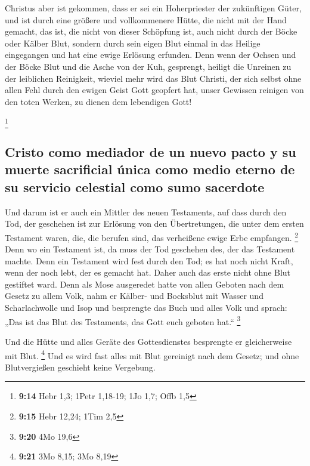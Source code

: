  Christus aber ist gekommen, dass er sei ein
Hoherpriester der zukünftigen Güter, und ist durch eine größere und
vollkommenere Hütte, die nicht mit der Hand gemacht, das ist, die nicht
von dieser Schöpfung ist,  auch nicht durch der Böcke
oder Kälber Blut, sondern durch sein eigen Blut einmal in das Heilige
eingegangen und hat eine ewige Erlösung erfunden.  Denn
wenn der Ochsen und der Böcke Blut und die Asche von der Kuh, gesprengt,
heiligt die Unreinen zu der leiblichen Reinigkeit, 
wieviel mehr wird das Blut Christi, der sich selbst ohne allen Fehl
durch den ewigen Geist Gott geopfert hat, unser Gewissen reinigen von
den toten Werken, zu dienen dem lebendigen Gott!

\footnote{\textbf{9:14} Hebr 1,3; 1Petr 1,18-19; 1Jo 1,7; Offb 1,5}

\hypertarget{cristo-como-mediador-de-un-nuevo-pacto-y-su-muerte-sacrificial-uxfanica-como-medio-eterno-de-su-servicio-celestial-como-sumo-sacerdote}{%
\subsection{Cristo como mediador de un nuevo pacto y su muerte
sacrificial única como medio eterno de su servicio celestial como sumo
sacerdote}\label{cristo-como-mediador-de-un-nuevo-pacto-y-su-muerte-sacrificial-uxfanica-como-medio-eterno-de-su-servicio-celestial-como-sumo-sacerdote}}

 Und darum ist er auch ein Mittler des neuen Testaments,
auf dass durch den Tod, der geschehen ist zur Erlösung von den
Übertretungen, die unter dem ersten Testament waren, die, die berufen
sind, das verheißene ewige Erbe empfangen. \footnote{\textbf{9:15} Hebr
  12,24; 1Tim 2,5}  Denn wo ein Testament ist, da muss
der Tod geschehen des, der das Testament machte.  Denn
ein Testament wird fest durch den Tod; es hat noch nicht Kraft, wenn der
noch lebt, der es gemacht hat.  Daher auch das erste
nicht ohne Blut gestiftet ward.  Denn als Mose ausgeredet
hatte von allen Geboten nach dem Gesetz zu allem Volk, nahm er Kälber-
und Bocksblut mit Wasser und Scharlachwolle und Isop und besprengte das
Buch und alles Volk  und sprach: „Das ist das Blut des
Testaments, das Gott euch geboten hat.`` \footnote{\textbf{9:20} 4Mo
  19,6}

 Und die Hütte und alles Geräte des Gottesdienstes
besprengte er gleicherweise mit Blut. \footnote{\textbf{9:21} 3Mo 8,15;
  3Mo 8,19}  Und es wird fast alles mit Blut gereinigt
nach dem Gesetz; und ohne Blutvergießen geschieht keine Vergebung.

